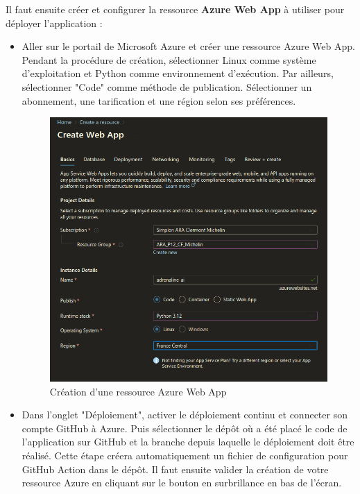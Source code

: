 \documentclass[french]{article}
\begin{document}
    Il faut ensuite créer et configurer la ressource \textbf{Azure Web App} à utiliser pour déployer l'application :
    \begin{itemize}
        \item Aller sur le portail de Microsoft Azure et créer une ressource Azure Web App. Pendant la procédure de création, sélectionner Linux comme système d'exploitation et Python comme environnement d'exécution. Par ailleurs, sélectionner "Code" comme méthode de publication. Sélectionner un abonnement, une tarification et une région selon ses préférences.
        \begin{figure}[h!]
            \includegraphics[width=12cm]{azure_2}
            \centering
            \caption{Création d'une ressource Azure Web App}
            \centering
        \end{figure}
        \item Dans l'onglet "Déploiement", activer le déploiement continu et connecter son compte GitHub à Azure. Puis sélectionner le dépôt où a été placé le code de l'application sur GitHub et la branche depuis laquelle le déploiement doit être réalisé. Cette étape créera automatiquement un fichier de configuration pour GitHub Action dans le dépôt. Il faut ensuite valider la création de votre ressource Azure en cliquant sur le bouton en surbrillance en bas de l'écran.
        \begin{figure}[h!]

\end{figure}
\end{itemize}
\end{document}
